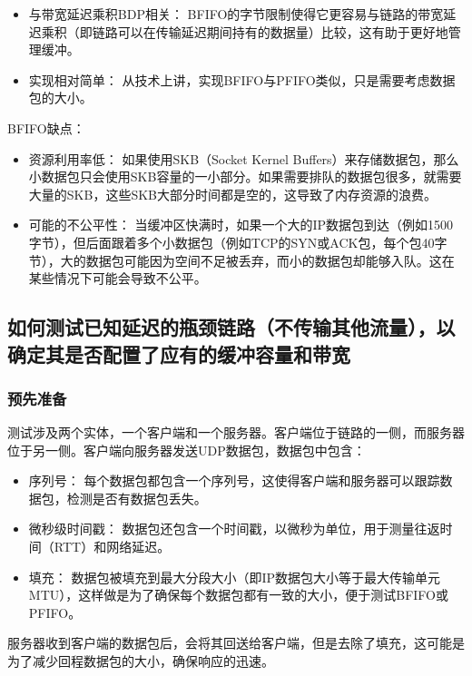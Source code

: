 \begin{itemize}
	\item 与带宽延迟乘积BDP相关： BFIFO的字节限制使得它更容易与链路的带宽延迟乘积（即链路可以在传输延迟期间持有的数据量）比较，这有助于更好地管理缓冲。
	\item 实现相对简单： 从技术上讲，实现BFIFO与PFIFO类似，只是需要考虑数据包的大小。
\end{itemize}

BFIFO缺点：

\begin{itemize}
	\item 资源利用率低： 如果使用SKB（Socket Kernel Buffers）来存储数据包，那么小数据包只会使用SKB容量的一小部分。如果需要排队的数据包很多，就需要大量的SKB，这些SKB大部分时间都是空的，这导致了内存资源的浪费。
	\item 可能的不公平性： 当缓冲区快满时，如果一个大的IP数据包到达（例如1500字节），但后面跟着多个小数据包（例如TCP的SYN或ACK包，每个包40字节），大的数据包可能因为空间不足被丢弃，而小的数据包却能够入队。这在某些情况下可能会导致不公平。


\end{itemize}

\subsection{如何测试已知延迟的瓶颈链路（不传输其他流量），以确定其是否配置了应有的缓冲容量和带宽}

\subsubsection{预先准备}

测试涉及两个实体，一个客户端和一个服务器。客户端位于链路的一侧，而服务器位于另一侧。客户端向服务器发送UDP数据包，数据包中包含：

\begin{itemize}
	\item 序列号： 每个数据包都包含一个序列号，这使得客户端和服务器可以跟踪数据包，检测是否有数据包丢失。
	\item 微秒级时间戳： 数据包还包含一个时间戳，以微秒为单位，用于测量往返时间（RTT）和网络延迟。
	\item 填充： 数据包被填充到最大分段大小（即IP数据包大小等于最大传输单元MTU），这样做是为了确保每个数据包都有一致的大小，便于测试BFIFO或PFIFO。
\end{itemize}

服务器收到客户端的数据包后，会将其回送给客户端，但是去除了填充，这可能是为了减少回程数据包的大小，确保响应的迅速。

